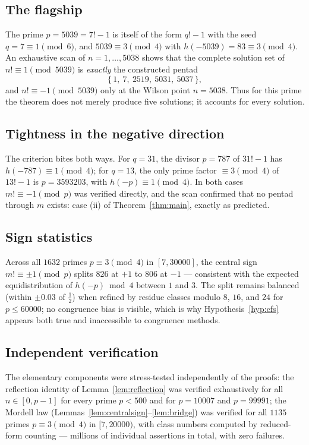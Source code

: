 \documentclass[11pt]{article}
\theoremstyle{definition}
\theoremstyle{remark}
\begin{document}
\subsection{The flagship}

The prime $p = 5039 = 7! - 1$ is itself of the form $q! - 1$ with the seed
$q = 7 \equiv 1 \pmod 6$, and $5039 \equiv 3 \pmod 4$ with
$h(-5039) = 83 \equiv 3 \pmod 4$. An exhaustive scan of $n = 1, \dots,
5038$ shows that the complete solution set of $n! \equiv 1 \pmod{5039}$ is
\emph{exactly} the constructed pentad
\[
  \{\, 1,\ 7,\ 2519,\ 5031,\ 5037 \,\},
\]
and $n! \equiv -1 \pmod{5039}$ only at the Wilson point $n = 5038$. Thus for
this prime the theorem does not merely produce five solutions; it accounts
for every solution.

\subsection{Tightness in the negative direction}

The criterion bites both ways. For $q = 31$, the divisor $p = 787$ of
$31! - 1$ has $h(-787) \equiv 1 \pmod 4$; for $q = 13$, the only prime
factor $\equiv 3 \pmod 4$ of $13! - 1$ is $p = 3593203$, with
$h(-p) \equiv 1 \pmod 4$. In both cases $m! \equiv -1 \pmod p$ was verified
directly, and the scan confirmed that no pentad through $m$ exists: case
(ii) of Theorem~\ref{thm:main}, exactly as predicted.

\subsection{Sign statistics}

Across all $1632$ primes $p \equiv 3 \pmod 4$ in $[7, 30000]$, the central
sign $m! \equiv \pm 1 \pmod p$ splits $826$ at $+1$ to $806$ at $-1$
--- consistent with the expected equidistribution of $h(-p) \bmod 4$
between $1$ and $3$. The split remains balanced (within $\pm 0.03$ of
$\tfrac12$) when refined by residue classes modulo $8$, $16$, and $24$ for
$p \le 60000$; no congruence bias is visible, which is why
Hypothesis~\ref{hyp:cfs} appears both true and inaccessible to congruence
methods.

\subsection{Independent verification}

The elementary components were stress-tested independently of the proofs:
the reflection identity of Lemma~\ref{lem:reflection} was verified
exhaustively for all $n \in [0, p-1]$ for every prime $p < 500$ and for
$p = 10007$ and $p = 99991$; the Mordell law
(Lemmas~\ref{lem:centralsign}--\ref{lem:bridge}) was verified for all
$1135$ primes $p \equiv 3 \pmod 4$ in $[7, 20000)$, with class numbers
computed by reduced-form counting --- millions of individual assertions in
total, with zero failures.
\end{document}
